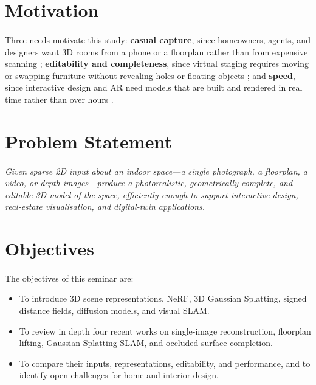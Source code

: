 \documentclass[12pt,a4paper,final]{extreport}
\begin{document}
\section{Motivation}

\paragraph{} Three needs motivate this study: \textbf{casual capture}, since homeowners, agents, and designers want 3D rooms from a phone or a floorplan rather than from expensive scanning \cite{p1,p2}; \textbf{editability and completeness}, since virtual staging requires moving or swapping furniture without revealing holes or floating objects \cite{p1,p4}; and \textbf{speed}, since interactive design and AR need models that are built and rendered in real time rather than over hours \cite{p3}.

\section{Problem Statement}

\paragraph{} \emph{Given sparse 2D input about an indoor space---a single photograph, a floorplan, a video, or depth images---produce a photorealistic, geometrically complete, and editable 3D model of the space, efficiently enough to support interactive design, real-estate visualisation, and digital-twin applications.}

\section{Objectives}

\paragraph{} The objectives of this seminar are:
\begin{itemize}
  \item To introduce 3D scene representations, NeRF, 3D Gaussian Splatting, signed distance fields, diffusion models, and visual SLAM.
  \item To review in depth four recent works on single-image reconstruction, floorplan lifting, Gaussian Splatting SLAM, and occluded surface completion.
  \item To compare their inputs, representations, editability, and performance, and to identify open challenges for home and interior design.
\end{itemize}
\end{document}
